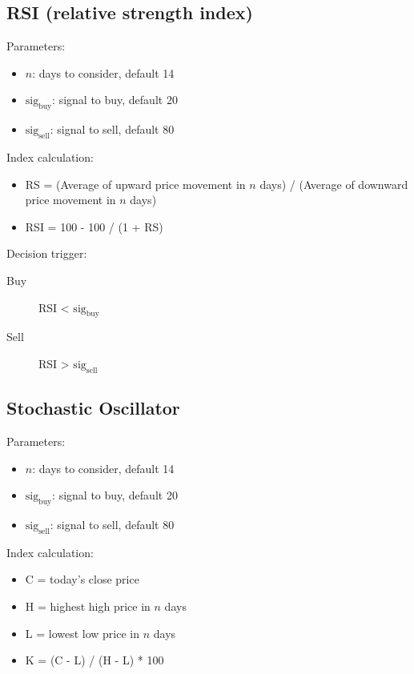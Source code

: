 \documentclass{article}
\begin{document}
\subsection{RSI (relative strength index)}

Parameters\cite{stock-market-prediction-model-using-TPWS}:
\begin{itemize}
    \item $n$: days to consider, default 14
    \item $\text{sig}_{\text{buy}}$: signal to buy, default 20
    \item $\text{sig}_{\text{sell}}$: signal to sell, default 80
\end{itemize}

Index calculation:
\begin{itemize}
    \item RS = (Average of upward price movement in $n$ days) / (Average of downward price movement in $n$ days)
    \item RSI = 100 - 100 / (1 + RS)
\end{itemize}

Decision trigger:
\begin{description}
    \item[Buy] RSI < $\text{sig}_{\text{buy}}$
    \item[Sell] RSI > $\text{sig}_{\text{sell}}$
\end{description}


\subsection{Stochastic Oscillator}

Parameters\cite{stock-market-prediction-model-using-TPWS}:
\begin{itemize}
    \item $n$: days to consider, default 14
    \item $\text{sig}_{\text{buy}}$: signal to buy, default 20
    \item $\text{sig}_{\text{sell}}$: signal to sell, default 80
\end{itemize}

Index calculation:
\begin{itemize}
    \item C = today's close price
    \item H = highest high price in $n$ days
    \item L = lowest low price in $n$ days
    \item K = (C - L) / (H - L) * 100
\end{itemize}
\end{document}

